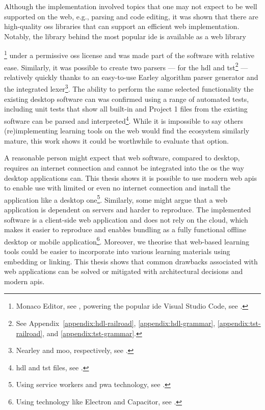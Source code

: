 Although the implementation involved topics that one may not expect to be well supported on the web, e.g., parsing and code editing, it was shown that there are high-quality \gls{oss} libraries that can support an efficient web implementation.
Notably, the library behind the most popular \gls{ide} is available as a web library{\footnote{Monaco Editor, see , powering the popular \gls{ide} Visual Studio Code, see .} under a permissive \gls{oss} license and was made part of the software with relative ease.
Similarly, it was possible to create two parsers --- for the \gls{hdl} and \gls{tst}\footnote{See Appendix~\ref{appendix:hdl-railroad}, \ref{appendix:hdl-grammar}, \ref{appendix:tst-railroad}, and \ref{appendix:tst-grammar}.} --- relatively quickly thanks to an easy-to-use Earley algorithm parser generator and the integrated lexer\footnote{Nearley and moo, respectively, see .}.
The ability to perform the same selected functionality the existing desktop software can was confirmed using a range of automated tests, including unit tests that show all built-in and Project 1 files from the existing software can be parsed and interpreted\footnote{\gls{hdl} and \gls{tst} files, see .}.
While it is impossible to say others (re)implementing learning tools on the web would find the ecosystem similarly mature, this work shows it could be worthwhile to evaluate that option.

A reasonable person might expect that web software, compared to desktop, requires an internet connection and cannot be integrated into the \gls{os} the way desktop applications can.
This thesis shows it is possible to use modern web \glspl{api} to enable use with limited or even no internet connection and install the application like a desktop one\footnote{Using service workers and \gls{pwa} technology, see .}.
Similarly, some might argue that a web application is dependent on servers and harder to reproduce.
The implemented software is a client-side web application and does not rely on the cloud, which makes it easier to reproduce and enables bundling as a fully functional offline desktop or mobile application\footnote{Using technology like Electron and Capacitor, see .}.
Moreover, we theorise that web-based learning tools could be easier to incorporate into various learning materials using embedding or linking.
This thesis shows that common drawbacks associated with web applications can be solved or mitigated with architectural decisions and modern \glspl{api}.

}
